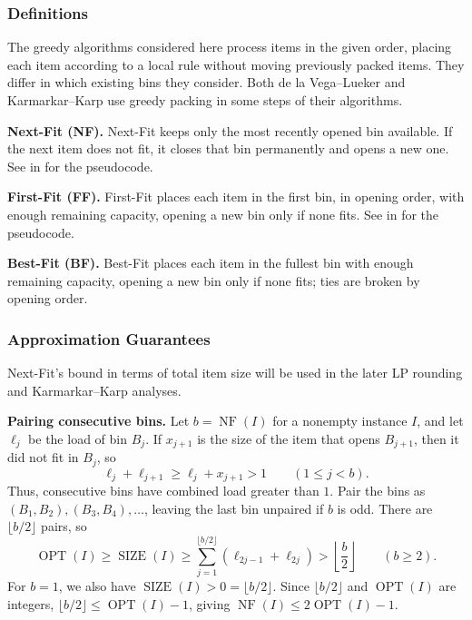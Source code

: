 \documentclass[11pt,a4paper,onecolumn]{article}
\theoremstyle{plain}
\theoremstyle{definition}
\theoremstyle{remark}
\DeclareMathOperator{\OPT}{OPT}
\DeclareMathOperator{\SIZE}{SIZE}
\DeclareMathOperator{\NF}{NF}
\begin{document}
\subsubsection{Definitions}

The greedy algorithms considered here process items in the given order,
placing each item according to a local rule without moving previously
packed items. They differ in which existing bins they consider.
Both de la Vega--Lueker and Karmarkar--Karp use greedy packing
in some steps of their algorithms.

\smallskip
\noindent\textbf{Next-Fit (NF).}
Next-Fit keeps only the most recently opened bin available. If the next
item does not fit, it closes that bin permanently and opens a new one.
See  in  for the pseudocode.

\smallskip
\noindent\textbf{First-Fit (FF).}
First-Fit places each item in the first bin, in opening order, with enough
remaining capacity, opening a new bin only if none fits.
See  in  for the pseudocode.

\smallskip
\noindent\textbf{Best-Fit (BF).}
Best-Fit places each item in the fullest bin with enough remaining
capacity, opening a new bin only if none fits; ties are broken by opening
order.

\subsubsection{Approximation Guarantees}
\label{subsubsec:greedy-guarantees}

Next-Fit's bound in terms of total item size will be used in the later
LP rounding and Karmarkar--Karp analyses.

\smallskip
\noindent\textbf{Pairing consecutive bins.}
Let $b=\NF(I)$ for a nonempty instance $I$, and let $\ell_j$ be
the load of bin $B_j$. If $x_{j+1}$ is the size of the item that
opens $B_{j+1}$, then it did not fit in $B_j$, so
\[
    \ell_j+\ell_{j+1}\ge\ell_j+x_{j+1}>1
    \qquad(1\le j<b).
\]
Thus, consecutive bins have combined load greater than $1$.
Pair the bins as $(B_1,B_2),(B_3,B_4),\ldots$, leaving the last bin
unpaired if $b$ is odd. There are $\lfloor b/2\rfloor$ pairs, so
\[
    \OPT(I)\ge\SIZE(I)
    \ge\sum_{j=1}^{\lfloor b/2\rfloor}(\ell_{2j-1}+\ell_{2j})
    >\left\lfloor\frac{b}{2}\right\rfloor
    \qquad(b\ge2).
\]
For $b=1$, we also have $\SIZE(I)>0=\lfloor b/2\rfloor$.
Since $\lfloor b/2\rfloor$ and $\OPT(I)$ are integers,
$\lfloor b/2\rfloor\le\OPT(I)-1$, giving
$\NF(I)\le2\OPT(I)-1$.
\end{document}
